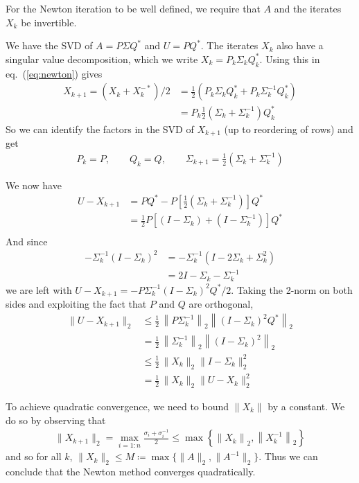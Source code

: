 \documentclass[10pt, A4paper]{article}
\begin{document}
For the Newton iteration to be well defined, we require that $A$ and 
the iterates $X_k$ be invertible.

We have the SVD of $A = P\Sigma Q^*$ and $U = PQ^*$.
The iterates $X_k$ also have a singular value decomposition, which we 
write $X_k=P_k \Sigma_k Q_k^*$. Using this in eq.~(\ref{eq:newton}) 
gives
\begin{align}
	X_{k+1} = (X_k + X_k^{-*})/2 &= \frac{1}{2} (P_k \Sigma_k Q_k^* + 
	P_k \Sigma_k^{-1} Q_k^*)\\
	&= P_k \frac{1}{2}(\Sigma_k + \Sigma_k^{-1}) Q_k^*
\end{align}
So we can identify the factors in the SVD of $X_{k+1}$ (up to 
reordering of rows) and get 
\begin{align}
	P_k = P, \qquad Q_k = Q, \qquad \Sigma_{k+1} = \frac{1}{2}
	\left(\Sigma_k + \Sigma_k^{-1} \right)
\end{align}

We now have
\begin{align}
	U - X_{k+1} &= PQ^* - P\left[\frac{1}{2}
	\left(\Sigma_k + \Sigma_k^{-1}\right)\right] Q^* \\
	&= \frac{1}{2} P \left[\left(I - \Sigma_k\right) + 
	\left(I - \Sigma_k^{-1}\right) \right] Q^* \\
\end{align}
And since
\begin{align}
	- \Sigma_k^{-1} (I - \Sigma_k)^2 &= -\Sigma_k^{-1}
	\left(I - 2 \Sigma_k + \Sigma_k^2\right) \\
	&= 2I -\Sigma_k - \Sigma_k^{-1}
\end{align}
we are left with $U - X_{k+1} = -P \Sigma_k^{-1} \left( I - \Sigma_k
\right)^2 Q^* /2$.
Taking the 2-norm on both sides and exploiting the fact that $P$ and 
$Q$ are orthogonal,
\begin{align}
	\| U - X_{k+1} \|_2 &\leq \frac{1}{2}\, \left\| P\Sigma_k^{-1} 
	\right\|_2 \left\| (I - \Sigma_k)^2 Q^*\right\|_2 \\
	&= \frac{1}{2}\, \left\|\Sigma_k^{-1}\right\|_2 \left\| \left( I - 
	\Sigma_k \right)^2 \right\|_2 \\
	&\leq \frac{1}{2}\, \|X_k\|_2 \|I - \Sigma_k\|_2^2 \\
	&= \frac{1}{2}\, \|X_k\|_2 \|U - X_k\|_2^2
\end{align}

To achieve quadratic convergence, we need to bound $\|X_k\|$ by a 
constant. We do so by observing that
\begin{align}
	\|X_{k+1}\|_2 = \max_{i = 1:n} \frac{\sigma_i + \sigma_i^{-1}}{2}
	\leq \max \left\{ \left\|X_k \right\|_2
	, \left\|X_k^{-1} \right\|_2 \right\}
\end{align}
and so for all $k$, $\|X_k\|_2 \leq M \coloneqq \max\{\|A\|_2, 
\|A^{-1}\|_2\}$.
Thus we can conclude that the Newton method converges quadratically.
\end{document}
